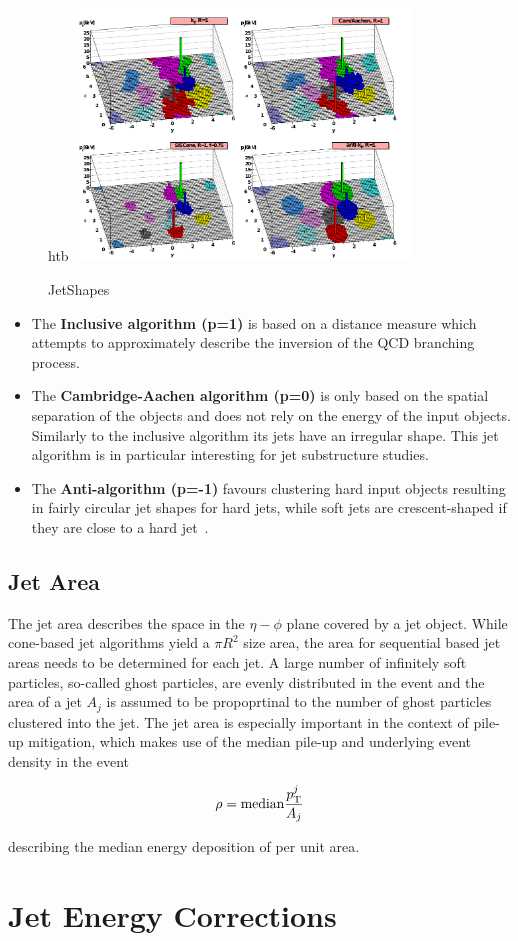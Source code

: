 \begin{figure}{htb}
    \centering
    \includegraphics[width=0.8\textwidth]{figures/jet_reconstruction/jet_shapes.pdf}
    \caption{JetShapes~\cite{Salam:2009jx}}
    \label{fig:jet_shapes}
\end{figure}

\begin{itemize}
    \item The \textbf{Inclusive \kt algorithm (p=1)} is based on a \ptsq
        distance measure which attempts to approximately describe the inversion
        of the QCD branching process.
    \item The \textbf{Cambridge-Aachen algorithm (p=0)} is only based on the
        spatial separation of the objects and does not rely on the energy of
        the input objects. Similarly to the inclusive \kt algorithm its jets
        have an irregular shape. This jet algorithm is in particular interesting
        for jet substructure studies.
    \item The \textbf{Anti-\kt algorithm (p=-1)} favours clustering hard input
        objects resulting in fairly circular jet shapes for hard jets, while
        soft jets are crescent-shaped if they are close to a hard jet~\cite{Cacciari:2008gp}.
\end{itemize}

\subsection{Jet Area}

The jet area describes the space in the $\eta-\phi$ plane covered by a jet
object. While cone-based jet algorithms yield a $\pi R^2$ size area, the area
for sequential based jet areas needs to be determined for each jet. A large
number of infinitely soft particles, so-called ghost particles, are evenly
distributed in the event and the area of a jet $A_j$ is assumed to be propoprtinal to the
number of ghost particles clustered into the jet. The jet area is
especially important in the context of pile-up mitigation, which makes use of
the median pile-up and underlying event \pt density \rho in the event 

\begin{equation}
    \rho = \text{median} \frac{p_{\mathrm{T}}^j}{A_j}
\end{equation}

describing the median energy deposition of per unit area.

\section{Jet Energy Corrections}
